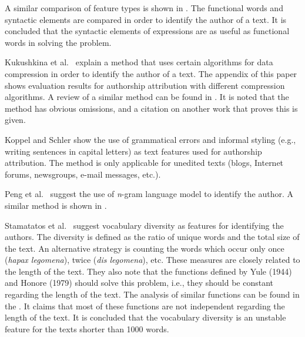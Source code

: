 \documentclass{llncs}
\begin{document}
A similar comparison of feature types is shown in
\cite{uzuner2005comparative}. The functional words and syntactic
elements are compared in order to identify the author of a text. It is
concluded that the syntactic elements of expressions are as useful as functional 
words in solving the problem.

Kukushkina et al.\ \cite{kukushkina2001using} explain a method that uses certain
algorithms for data compression in order to identify the author of a text. The
appendix of this paper shows evaluation results for authorship attribution with
different compression algorithms.
A review of a similar method can be found in 
\cite{zhao2005effective}. It is noted that the method has obvious omissions, 
and a citation on another work that proves this is given.

Koppel and Schler \cite{koppel2003exploiting} show the use of grammatical
errors and informal styling (e.g., writing sentences in capital letters) as text features used for authorship attribution.
The method is only applicable for unedited texts (blogs, Internet forums,
newsgroups, e-mail messages, etc.).

Peng et al.\ \cite{peng2003language} suggest the use of \emph{n}-gram language
model to identify the author. A similar method is shown in \cite{coyotl2006authorship}.

Stamatatos et al.\ \cite{stamatatos2001computer} suggest vocabulary diversity
as features for identifying the authors. The diversity is defined as the ratio of unique words 
and the total size of the text. An alternative strategy is counting the words which occur only once
(\emph{hapax legomena}), twice (\emph{dis legomena}), etc.
These measures are closely related to the length of the text. They also note that
the functions defined by Yule (1944) and Honore (1979) should solve this problem,
i.e., they should be constant regarding the length of the text. The analysis of
similar functions can be found in the \cite{tweedie1998variable}. It claims
that most of these functions are not independent regarding the length of the
text. It is concluded that the vocabulary diversity is an unstable feature for
the texts shorter than 1000 words.
\end{document}
